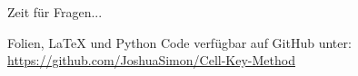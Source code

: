 \documentclass[aspectratio=169]{beamer}
\begin{document}

\begin{frame}
    \Huge{\centerline{Zeit für Fragen...}}
    \bigskip
    \bigskip
    \bigskip
    \bigskip

    \normalsize
    \centering
    Folien, \LaTeX \: und Python Code verfügbar auf GitHub unter:
    \url{https://github.com/JoshuaSimon/Cell-Key-Method}
    \newline
    \newline
\end{frame}

\end{document}
